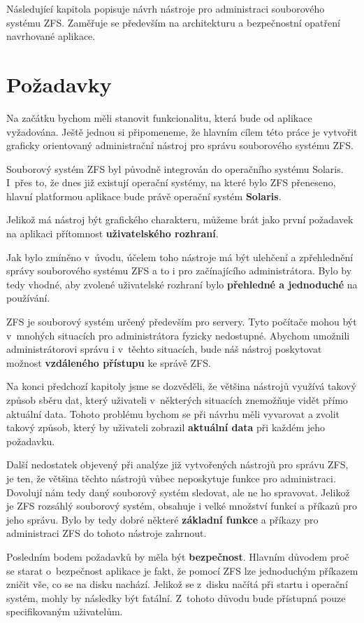 Následující kapitola popisuje návrh nástroje pro administraci souborového systému ZFS. Zaměřuje se především na architekturu a bezpečnostní opatření navrhované aplikace.
\section{Požadavky}
Na začátku bychom měli stanovit funkcionalitu, která bude od aplikace vyžadována. Ještě jednou si připomeneme, že hlavním cílem této práce je vytvořit graficky orientovaný administrační nástroj pro správu souborového systému ZFS.

Souborový systém ZFS byl původně integrován do operačního systému Solaris. I~přes to, že dnes již existují operační systémy, na které bylo ZFS přeneseno, hlavní platformou aplikace bude právě operační systém \textbf{Solaris}.

Jelikož má nástroj být grafického charakteru, můžeme brát jako první požadavek na aplikaci přítomnost \textbf{uživatelského rozhraní}.

Jak bylo zmíněno v~úvodu, účelem toho nástroje má být ulehčení a zpřehlednění správy souborového systému ZFS a to i pro začínajícího administrátora. Bylo by tedy vhodné, aby zvolené uživatelské rozhraní bylo \textbf{přehledné a jednoduché} na používání.

ZFS je souborový systém určený především pro servery. Tyto počítače mohou být v~mnohých situacích pro administrátora fyzicky nedostupné. Abychom umožnili administrátorovi správu i v~těchto situacích, bude náš nástroj poskytovat možnost \textbf{vzdáleného přístupu} ke správě ZFS.

Na konci předchozí kapitoly jsme se dozvěděli, že většina nástrojů využívá takový způsob sběru dat, který uživateli v~některých situacích znemožňuje vidět přímo aktuální data. Tohoto problému bychom se při návrhu měli vyvarovat a zvolit takový způsob, který by uživateli zobrazil \textbf{aktuální data} při každém jeho požadavku.

Další nedostatek objevený při analýze již vytvořených nástrojů pro správu ZFS, je ten, že většina těchto nástrojů vůbec neposkytuje funkce pro administraci. Dovolují nám tedy daný souborový systém sledovat, ale ne ho spravovat. Jelikož je ZFS rozsáhlý souborový systém, obsahuje i velké množství funkcí a příkazů pro jeho správu. Bylo by tedy dobré některé \textbf{základní funkce} a příkazy pro administraci ZFS do tohoto nástroje zahrnout.

Posledním bodem požadavků by měla být \textbf{bezpečnost}. Hlavním důvodem proč se starat o~bezpečnost aplikace je fakt, že pomocí ZFS lze jednoduchým příkazem zničit vše, co se na disku nachází. Jelikož se z~disku načítá při startu i operační systém, mohly by následky být fatální. Z~tohoto důvodu bude přístupná pouze specifikovaným uživatelům.

